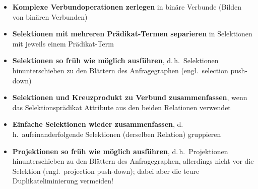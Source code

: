 \begin{note}
\begin{itemize}
	\item \textbf{Komplexe Verbundoperationen zerlegen} in binäre Verbunde (Bilden von binären Verbunden)
	\item \textbf{Selektionen mit mehreren Prädikat-Termen separieren} in Selektionen mit jeweils einem Prädikat-Term
	\item \textbf{Selektionen so früh wie möglich ausführen}, d.\,h.\ Selektionen hinunterschieben zu den Blättern des Anfragegraphen (engl.\ selection push-down)
	\item \textbf{Selektionen und Kreuzprodukt zu Verbund zusammenfassen}, wenn das Selektionsprädikat Attribute aus den beiden Relationen verwendet
	\item \textbf{Einfache Selektionen wieder zusammenfassen}, d.\,h.\ aufeinanderfolgende Selektionen (derselben Relation) gruppieren
	\item \textbf{Projektionen so früh wie möglich ausführen}, d.\,h.\ Projektionen hinunterschieben zu den Blättern des Anfragegraphen, allerdings nicht vor die Selektion (engl.\ projection push-down); dabei aber die teure Duplikateliminierung vermeiden!
\end{itemize}
\pagebreak
\end{note}

